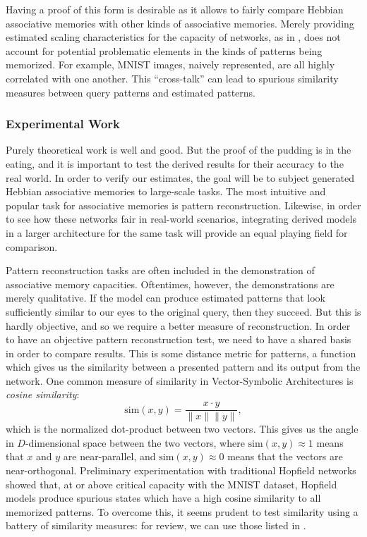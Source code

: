 \documentclass{article}
\theoremstyle{definition}
\begin{document}
Having a proof of this form is desirable as it allows to fairly compare
Hebbian associative memories with other kinds of associative memories.
Merely providing estimated scaling characteristics for
the capacity of networks, as in \textcite{lansner_benchmarking_2025}, does
not account for potential problematic elements in the kinds of patterns
being memorized. For example, MNIST \parencite{lecun_mnist_2010}
images, naively represented, are all highly correlated with one another.
This ``cross-talk'' \parencite{kohonen_correlation_1988} can lead
to spurious similarity measures between query patterns and estimated
patterns.

\subsubsection{Experimental Work}

Purely theoretical work is well and good. But the proof of the
pudding is in the eating,
and it is important to test the derived results for their accuracy to
the real world.
In order to verify our estimates, the goal will be to subject generated Hebbian
associative memories to large-scale tasks. The most intuitive and popular
task for associative memories is pattern reconstruction. Likewise, in order
to see how these networks fair in real-world scenarios, integrating
derived models in a larger architecture for the same task will provide
an equal playing field for comparison.

Pattern reconstruction tasks are often included in the demonstration of
associative memory capacities. Oftentimes, however, the demonstrations
are merely qualitative. If the model can produce estimated patterns that
look sufficiently similar to our eyes to the original query, then they succeed.
But this is hardly objective, and so we require a better measure of
reconstruction.
In order to have an objective pattern reconstruction test, we need to
have a shared basis in order to compare results. This is some
distance metric for patterns, a function which gives us the similarity
between a presented pattern and its output from the network. One common
measure of similarity in Vector-Symbolic Architectures
\parencites{smolensky_tensor_1990,plate_holographic_1995,gayler_multiplicative_1998}
is \textit{cosine similarity}:
\begin{equation}
  \text{sim}(x, y) = \frac{x \cdot y}{\|x \| \|y \|},
\end{equation}
which is the normalized dot-product between two vectors. This gives us the
angle in $D$-dimensional space between the two vectors, where
$\text{sim}(x, y) \approx 1$
means that $x$ and $y$ are near-parallel, and $\text{sim}(x, y)
\approx 0$ means that the
vectors are near-orthogonal. Preliminary experimentation
with traditional Hopfield networks showed that, at or above critical capacity
with the MNIST dataset, Hopfield models produce spurious states which have
a high cosine similarity to all memorized patterns.
To overcome this, it seems prudent to test similarity using a battery of
similarity measures: for review, we can use those listed in
\textcite{kelly_memory_2017}.
\end{document}
